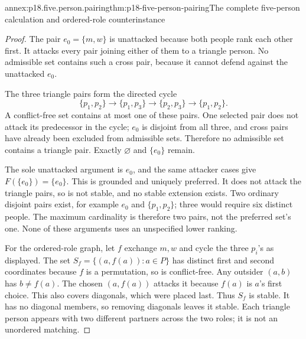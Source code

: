 \begin{annexitem}{annex:p18.five.person.pairing}{thm:p18-five-person-pairing}{The complete five-person calculation and ordered-role counterinstance}
\begin{proof}
The pair \(e_0=\{m,w\}\) is
unattacked because both people
rank each other first. It
attacks every pair joining
either of them to a triangle
person. No admissible set
contains such a cross pair,
because it cannot defend
against the unattacked
\(e_0\).

The three triangle pairs
form the directed cycle
\[
 \{p_1,p_2\}\to\{p_1,p_3\}\to
                    \{p_2,p_3\}\to\{p_1,p_2\}.
\]
A conflict-free set contains
at most one of these
pairs. One selected pair
does not attack its
predecessor in the cycle;
\(e_0\) is disjoint from
all three, and cross
pairs have already been
excluded from admissible
sets. Therefore no
admissible set contains
a triangle pair.
Exactly \(\varnothing\)
and \(\{e_0\}\) remain.

The sole unattacked argument
is \(e_0\), and the same
attacker cases give
\(F(\{e_0\})=\{e_0\}\).
This is grounded and
uniquely preferred. It
does not attack the
triangle pairs, so
is not stable, and
no stable extension
exists. Two ordinary
disjoint pairs exist,
for example \(e_0\)
and \(\{p_1,p_2\}\);
three would require
six distinct people.
The maximum cardinality
is therefore two pairs,
not the preferred set's
one. None of these
arguments uses an
unspecified lower ranking.

For the ordered-role graph,
let \(f\) exchange \(m,w\)
and cycle the three
\(p_i\)'s as displayed.
The set \(S_f=\{(a,f(a)):a\in P\}\)
has distinct first and
second coordinates because
\(f\) is a permutation,
so is conflict-free.
Any outsider \((a,b)\)
has \(b\ne f(a)\).
The chosen \((a,f(a))\)
attacks it because
\(f(a)\) is \(a\)'s
first choice. This
also covers diagonals,
which were placed last.
Thus \(S_f\) is stable.
It has no diagonal
members, so removing
diagonals leaves it
stable. Each triangle
person appears with
two different partners
across the two roles;
it is not an
unordered matching.
\end{proof}
\end{annexitem}

